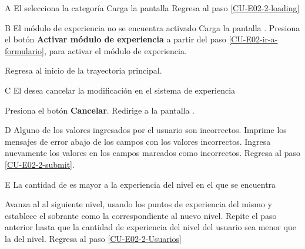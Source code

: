 \begin{UCtrayectoriaA}{A}{
El  selecciona la categoría }
  \Sistema Carga la pantalla 
  \Actor Regresa al paso \ref{CU-E02-2-loading}
\end{UCtrayectoriaA}

\begin{UCtrayectoriaA}{B}{
El módulo de experiencia no se encuentra activado}
  \Sistema Carga la pantalla .
  \Actor Presiona el botón {\bf Activar módulo de experiencia}
   a partir del paso \ref{CU-E02-ir-a-formulario},
                     para activar el módulo de experiencia.

  \Sistema Regresa al inicio de la trayectoria principal.

\end{UCtrayectoriaA}

\begin{UCtrayectoriaA}{C}{
El  desea cancelar la modificación en el sistema de
experiencia}

  \Actor Presiona el botón {\bf Cancelar}.
  \Sistema Redirige a la pantalla .
\end{UCtrayectoriaA}

\begin{UCtrayectoriaA}{D}{
Alguno de los valores ingresados por el usuario son incorrectos.}
  \Sistema Imprime los mensajes de error abajo de los campos con los valores
           incorrectos.
  \Actor Ingresa nuevamente los valores en los campos marcados como incorrectos.
  \Sistema Regresa al paso \ref{CU-E02-2-submit}.

\end{UCtrayectoriaA}

\begin{UCtrayectoriaA}{E}{%
La cantidad de  es mayor a la experiencia del nivel en el
que se encuentra}

  \Sistema Avanza al  al siguiente nivel, usando los
           puntos de experiencia del mismo y establece el sobrante como
           la  correspondiente al nuevo nivel.
  \Sistema Repite el paso anterior hasta que la cantidad de experiencia
           del nivel del usuario sea menor que la del nivel.
  \Sistema Regresa al paso \ref{CU-E02-2-Usuarios}

\end{UCtrayectoriaA}
